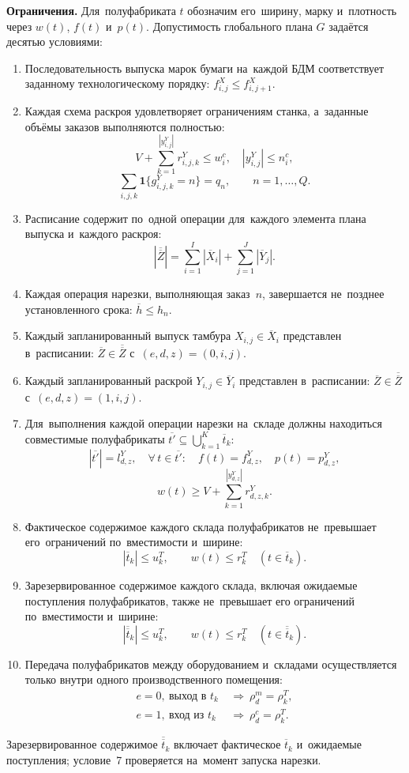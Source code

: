 \textbf{Ограничения.} Для~полуфабриката $t$ обозначим его~ширину, марку и~плотность через $w(t)$, $f(t)$ и~$p(t)$. Допустимость глобального плана $G$ задаётся десятью условиями:

\begin{enumerate}
    \item Последовательность выпуска марок бумаги на~каждой БДМ
    соответствует заданному технологическому порядку:
    $f^X_{i,j}\leq f^X_{i,j+1}$.
    \item Каждая схема раскроя удовлетворяет ограничениям станка,
    а~заданные объёмы заказов выполняются полностью:
    \[
    V+\sum_{k=1}^{|y^Y_{i,j}|}r^Y_{i,j,k}\leq w^c_i,\quad
    |y^Y_{i,j}|\leq n_i^c,
    \]
    \[
    \sum_{i,j,k}\mathbf{1}\{g^Y_{i,j,k}=n\}=q_n,
    \qquad n=1,\ldots,Q.
    \]
    \item Расписание содержит по~одной операции для~каждого элемента
    плана выпуска и~каждого раскроя:
    \[
    |\overline{\overline{Z}}|
      =\sum_{i=1}^{I}|\overline{X}_i|
       +\sum_{j=1}^{J}|\overline{Y}_j|.
    \]
    \item Каждая операция нарезки, выполняющая заказ~$n$, завершается
    не~позднее установленного срока: $\overline h\leq h_n$.
    \item Каждый запланированный выпуск тамбура
    $X_{i,j}\in\overline{X}_i$ представлен в~расписании:
    $\overline Z\in\overline{\overline Z}$ с~$(e,d,z)=(0,i,j)$.
    \item Каждый запланированный раскрой
    $Y_{i,j}\in\overline{Y}_i$ представлен в~расписании:
    $\overline Z\in\overline{\overline Z}$ с~$(e,d,z)=(1,i,j)$.
    \item Для~выполнения каждой операции нарезки на~складе должны
    находиться совместимые полуфабрикаты
    $\overline{t'}\subseteq\bigcup_{k=1}^{K}\overline t_k$:
    \[
    |\overline{t'}|=l^Y_{d,z},\quad
    \forall\,t\in\overline{t'}:\quad
    f(t)=f^Y_{d,z},\quad p(t)=p^Y_{d,z},
    \]
    \[
    w(t)\geq V+\sum_{k=1}^{|y^Y_{d,z}|}r^Y_{d,z,k}.
    \]
    \item Фактическое содержимое каждого склада полуфабрикатов
    не~превышает его~ограничений по~вместимости и~ширине:
    \[
    |\overline t_k|\leq u_k^T,\qquad
    w(t)\leq r_k^T\quad(t\in\overline t_k).
    \]
    \item Зарезервированное содержимое каждого склада, включая
    ожидаемые поступления полуфабрикатов, также не~превышает его
    ограничений по~вместимости и~ширине:
    \[
    |\overline{\overline t}_k|\leq u_k^T,\qquad
    w(t)\leq r_k^T\quad(t\in\overline{\overline t}_k).
    \]
    \item Передача полуфабрикатов между оборудованием и~складами
    осуществляется только внутри одного производственного помещения:
    \[
    \begin{aligned}
    e=0,\ \text{выход в }t_k&\ \Longrightarrow\ \rho^m_d=\rho^T_k,\\
    e=1,\ \text{вход из }t_k&\ \Longrightarrow\ \rho^c_d=\rho^T_k.
    \end{aligned}
    \]
\end{enumerate}
Зарезервированное содержимое $\overline{\overline t}_k$ включает фактическое $\overline t_k$ и~ожидаемые поступления; условие~7 проверяется на~момент запуска нарезки.

